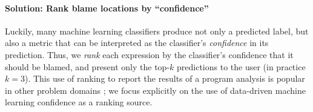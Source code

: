 \paragraph{\textbf{Solution: Rank blame locations by ``confidence''}}
Luckily, many machine learning classifiers produce not only a predicted
label, but also a metric that can be interpreted as the classifier's
\emph{confidence} in its prediction.
%
Thus, we \emph{rank} each expression by the classifier's confidence that
it should be blamed, and present only the top-$k$ predictions to the
user (in practice $k=3$). This use of ranking to report
the results of a program analysis is popular in other problem domains
\citep[see, \eg][]{Kremenek2003-ck}; we focus
explicitly on the use of data-driven machine learning confidence as a
ranking source.



